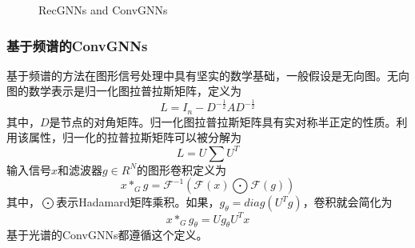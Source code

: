 \begin{figure}[htbp]
	\caption{RecGNNs and ConvGNNs} %
	\label{fig:RGNN_CGNN}  %
\end{figure}	

\subsubsection{基于频谱的ConvGNNs}

基于频谱的方法在图形信号处理中具有坚实的数学基础，一般假设是无向图。无向图的数学表示是归一化图拉普拉斯矩阵，定义为
\[L=I_n-D^{-\frac{1}{2}}AD^{-\frac{1}{2}}\]
其中，$D$是节点的对角矩阵。归一化图拉普拉斯矩阵具有实对称半正定的性质。利用该属性，归一化的拉普拉斯矩阵可以被分解为
\[L=U\sum U^T\]
输入信号$x$和滤波器$g\in R^N$的图形卷积定义为
\[
x*_Gg=\mathcal{F}^{-1}(\mathcal{F}(x)\bigodot \mathcal{F}(g))
\]
其中，$\bigodot$表示Hadamard矩阵乘积。如果，$g_{\theta}=diag(U^Tg)$，卷积就会简化为
\[
x*_Gg_{\theta}=Ug_{\theta}U^Tx
\]
基于光谱的ConvGNNs都遵循这个定义。

